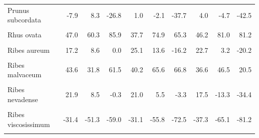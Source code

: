 \begin{longtable}[t]{lrrrrrrrrr}
Prunus subcordata & -7.9 & 8.3 & -26.8 & 1.0 & -2.1 & -37.7 & 4.0 & -4.7 & -42.5\\
\cellcolor{gray!10}{Prunus virginiana} & \cellcolor{gray!10}{-55.9} & \cellcolor{gray!10}{-64.5} & \cellcolor{gray!10}{-75.7} & \cellcolor{gray!10}{-48.5} & \cellcolor{gray!10}{-71.9} & \cellcolor{gray!10}{-79.1} & \cellcolor{gray!10}{-47.7} & \cellcolor{gray!10}{-78.1} & \cellcolor{gray!10}{-74.1}\\
Rhus ovata & 47.0 & 60.3 & 85.9 & 37.7 & 74.9 & 65.3 & 46.2 & 81.0 & 81.2\\
\addlinespace
\cellcolor{gray!10}{Rhus trilobata} & \cellcolor{gray!10}{34.0} & \cellcolor{gray!10}{62.6} & \cellcolor{gray!10}{117.3} & \cellcolor{gray!10}{29.7} & \cellcolor{gray!10}{105.4} & \cellcolor{gray!10}{107.0} & \cellcolor{gray!10}{34.4} & \cellcolor{gray!10}{100.0} & \cellcolor{gray!10}{101.3}\\
Ribes aureum & 17.2 & 8.6 & 0.0 & 25.1 & 13.6 & -16.2 & 22.7 & 3.2 & -20.2\\
\cellcolor{gray!10}{Ribes cereum} & \cellcolor{gray!10}{-36.2} & \cellcolor{gray!10}{-57.0} & \cellcolor{gray!10}{-71.1} & \cellcolor{gray!10}{-31.1} & \cellcolor{gray!10}{-64.8} & \cellcolor{gray!10}{-76.0} & \cellcolor{gray!10}{-42.2} & \cellcolor{gray!10}{-68.9} & \cellcolor{gray!10}{-81.5}\\
Ribes malvaceum & 43.6 & 31.8 & 61.5 & 40.2 & 65.6 & 66.8 & 36.6 & 46.5 & 20.5\\
\cellcolor{gray!10}{Ribes menziesii} & \cellcolor{gray!10}{-5.8} & \cellcolor{gray!10}{4.7} & \cellcolor{gray!10}{19.7} & \cellcolor{gray!10}{7.9} & \cellcolor{gray!10}{27.7} & \cellcolor{gray!10}{22.7} & \cellcolor{gray!10}{7.2} & \cellcolor{gray!10}{1.1} & \cellcolor{gray!10}{-25.7}\\
\addlinespace
Ribes nevadense & 21.9 & 8.5 & -0.3 & 21.0 & 5.5 & -3.3 & 17.5 & -13.3 & -34.4\\
\cellcolor{gray!10}{Ribes roezlii} & \cellcolor{gray!10}{0.5} & \cellcolor{gray!10}{-8.9} & \cellcolor{gray!10}{-15.4} & \cellcolor{gray!10}{-3.9} & \cellcolor{gray!10}{-13.1} & \cellcolor{gray!10}{-33.2} & \cellcolor{gray!10}{-4.6} & \cellcolor{gray!10}{-25.4} & \cellcolor{gray!10}{-44.1}\\
Ribes viscosissimum & -31.4 & -51.3 & -59.0 & -31.1 & -55.8 & -72.5 & -37.3 & -65.1 & -81.2\\
\cellcolor{gray!10}{Rubus parviflorus} & \cellcolor{gray!10}{-27.3} & \cellcolor{gray!10}{-41.3} & \cellcolor{gray!10}{-43.9} & \cellcolor{gray!10}{-29.0} & \cellcolor{gray!10}{-43.2} & \cellcolor{gray!10}{-59.6} & \cellcolor{gray!10}{-34.5} & \cellcolor{gray!10}{-48.8} & \cellcolor{gray!10}{-63.1}\\

\end{longtable}
